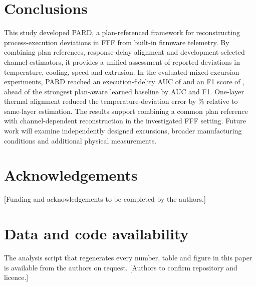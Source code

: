 \documentclass[10pt,a4paper,twocolumn]{article}
\begin{document}
\section{Conclusions}
This study developed PARD, a plan-referenced framework for reconstructing process-execution deviations in FFF from built-in firmware telemetry. By combining plan references, response-delay alignment and development-selected channel estimators, it provides a unified assessment of reported deviations in temperature, cooling, speed and extrusion. In the evaluated mixed-excursion experiments, PARD reached an execution-fidelity AUC of \aucPard{} and an F1 score of \fonePard{}, ahead of the strongest plan-aware learned baseline by \dAucBthree{} AUC and \dFoneBthree{} F1. One-layer thermal alignment reduced the temperature-deviation error by \thRedPct\% relative to same-layer estimation. The results support combining a common plan reference with channel-dependent reconstruction in the investigated FFF setting. Future work will examine independently designed excursions, broader manufacturing conditions and additional physical measurements.

\section*{Acknowledgements}
[Funding and acknowledgements to be completed by the authors.]

\section*{Data and code availability}
The analysis script that regenerates every number, table and figure in this paper is available from the authors on request. [Authors to confirm repository and licence.]
\end{document}
